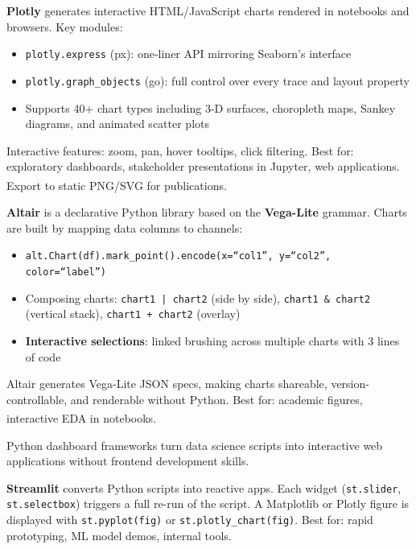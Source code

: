 \begin{tcbitemize}[ skin=sectionraster ]
    \tcbitem[title={Plotly: Interactive Visualization}, raster multicolumn=3]
    \textbf{Plotly} generates interactive HTML/JavaScript charts rendered in notebooks and
    browsers. Key modules:
    \begin{itemize}
        \item \texttt{plotly.express} (px): one-liner API mirroring Seaborn's interface
        \item \texttt{plotly.graph\_objects} (go): full control over every trace and layout
              property
        \item Supports 40+ chart types including 3-D surfaces, choropleth maps, Sankey
              diagrams, and animated scatter plots
    \end{itemize}
    Interactive features: zoom, pan, hover tooltips, click filtering.
    Best for: exploratory dashboards, stakeholder presentations in Jupyter,
    web applications. Export to static PNG/SVG for
    publications\textsuperscript{\cite[][pp.~1--20]{loducaDataStorytellingAltair2024}}.

    \tcbitem[title={Altair: Declarative Visualization}, raster multicolumn=3]
    \textbf{Altair} is a declarative Python library based on the \textbf{Vega-Lite}
    grammar. Charts are built by mapping data columns to channels:
    \begin{itemize}
        \item \texttt{alt.Chart(df).mark\_point().encode(x=``col1'', y=``col2'',
              color=``label'')}
        \item Composing charts: \texttt{chart1 | chart2} (side by side),
              \texttt{chart1 \& chart2} (vertical stack), \texttt{chart1 + chart2}
              (overlay)
        \item \textbf{Interactive selections}: linked brushing across multiple charts with
              3 lines of code
    \end{itemize}
    Altair generates Vega-Lite JSON specs, making charts shareable, version-controllable,
    and renderable without Python. Best for: academic figures, interactive EDA in
    notebooks\textsuperscript{\cite[][pp.~50--120]{loducaDataStorytellingAltair2024}}.

    \tcbitem[title={Streamlit and Dash: Dashboard Frameworks}, raster multicolumn=6]
    Python dashboard frameworks turn data science scripts into interactive web applications
    without frontend development skills.

    \textbf{Streamlit} converts Python scripts into reactive apps. Each widget
    (\texttt{st.slider}, \texttt{st.selectbox}) triggers a full re-run of the script.
    A Matplotlib or Plotly figure is displayed with \texttt{st.pyplot(fig)} or
    \texttt{st.plotly\_chart(fig)}. Best for: rapid prototyping, ML model demos,
    internal tools.


\end{tcbitemize}
